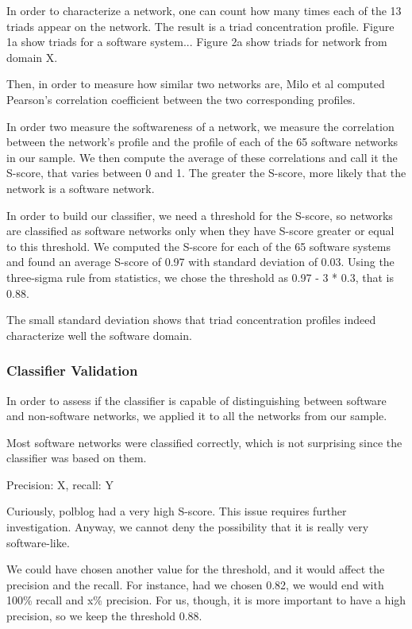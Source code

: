 
In order to characterize a network, one can count how many times each of the
13 triads appear on the network. The result is a triad concentration profile.
Figure 1a show triads for a software system... Figure 2a show triads for network
from domain X.

Then, in order to measure how similar two networks are, Milo et al computed
Pearson's correlation coefficient between the two corresponding profiles.

In order two measure the softwareness of a network, we measure the correlation
between the network's profile and the profile of each of the 65 software
networks in our sample. We then compute the average of these correlations and
call it the S-score, that varies between 0 and 1. The greater the S-score, more
likely that the network is a software network.

In order to build our classifier, we need a threshold for the S-score, so
networks are classified as software networks only when they have S-score greater
or equal to this threshold. We computed the S-score for each of the 65 software
systems and found an average S-score of 0.97 with standard deviation of 0.03.
Using the three-sigma rule from statistics, we chose the threshold as 0.97 - 3 *
0.3, that is 0.88. 

The small standard deviation shows that triad concentration profiles indeed
characterize well the software domain.

\subsubsection{Classifier Validation}

In order to assess if the classifier is capable of distinguishing between
software and non-software networks, we applied it to all the networks from our
sample. 

Most software networks were classified correctly, which is not surprising since
the classifier was based on them.

Precision: X, recall: Y

Curiously, polblog had a very high S-score. This issue requires further 
investigation. Anyway, we cannot deny the possibility that it is really very
software-like.

We could have chosen another value for the threshold, and it would affect the
precision and the recall. For instance, had we chosen 0.82, we would end with
100\% recall and x\% precision. For us, though, it is more important to have a
high precision, so we keep the threshold 0.88.

